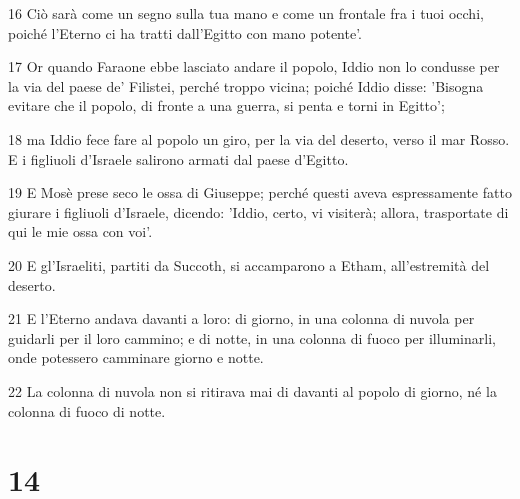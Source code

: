 \par 16 Ciò sarà come un segno sulla tua mano e come un frontale fra i tuoi occhi, poiché l'Eterno ci ha tratti dall'Egitto con mano potente'.
\par 17 Or quando Faraone ebbe lasciato andare il popolo, Iddio non lo condusse per la via del paese de' Filistei, perché troppo vicina; poiché Iddio disse: 'Bisogna evitare che il popolo, di fronte a una guerra, si penta e torni in Egitto';
\par 18 ma Iddio fece fare al popolo un giro, per la via del deserto, verso il mar Rosso. E i figliuoli d'Israele salirono armati dal paese d'Egitto.
\par 19 E Mosè prese seco le ossa di Giuseppe; perché questi aveva espressamente fatto giurare i figliuoli d'Israele, dicendo: 'Iddio, certo, vi visiterà; allora, trasportate di qui le mie ossa con voi'.
\par 20 E gl'Israeliti, partiti da Succoth, si accamparono a Etham, all'estremità del deserto.
\par 21 E l'Eterno andava davanti a loro: di giorno, in una colonna di nuvola per guidarli per il loro cammino; e di notte, in una colonna di fuoco per illuminarli, onde potessero camminare giorno e notte.
\par 22 La colonna di nuvola non si ritirava mai di davanti al popolo di giorno, né la colonna di fuoco di notte.

\chapter{14}

